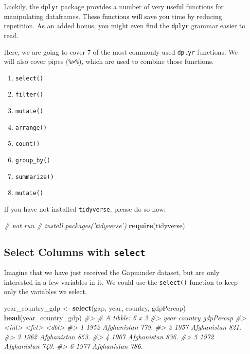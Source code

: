 \documentclass[]{book}
\newenvironment{Shaded}{\begin{snugshade}}{\end{snugshade}}
\newcommand{\KeywordTok}[1]{\textcolor[rgb]{0.13,0.29,0.53}{\textbf{#1}}}
\newcommand{\StringTok}[1]{\textcolor[rgb]{0.31,0.60,0.02}{#1}}
\newcommand{\CommentTok}[1]{\textcolor[rgb]{0.56,0.35,0.01}{\textit{#1}}}
\newcommand{\NormalTok}[1]{#1}
\providecommand{\tightlist}{%
  \setlength{\itemsep}{0pt}\setlength{\parskip}{0pt}}
\begin{document}
Luckily, the
\href{https://cran.r-project.org/web/packages/dplyr/dplyr.pdf}{\texttt{dplyr}}
package provides a number of very useful functions for manipulating
dataframes. These functions will save you time by reducing repetition.
As an added bonus, you might even find the \texttt{dplyr} grammar easier
to read.

Here, we are going to cover 7 of the most commonly used \texttt{dplyr}
functions. We will also cover pipes (\texttt{\%\textgreater{}\%}), which
are used to combine those functions.

\begin{enumerate}
\def\labelenumi{\arabic{enumi}.}
\tightlist
\item
  \texttt{select()}
\item
  \texttt{filter()}
\item
  \texttt{mutate()}
\item
  \texttt{arrange()}
\item
  \texttt{count()}
\item
  \texttt{group\_by()}
\item
  \texttt{summarize()}
\item
  \texttt{mutate()}
\end{enumerate}

If you have not installed \texttt{tidyverse}, please do so now:

\begin{Shaded}
\begin{Highlighting}[]
\CommentTok{# not run}
\CommentTok{# install.packages('tidyverse')}
\KeywordTok{require}\NormalTok{(tidyverse)}
\end{Highlighting}
\end{Shaded}

\subsection{\texorpdfstring{Select Columns with
\texttt{select}}{Select Columns with select}}\label{select-columns-with-select}

Imagine that we have just received the Gapminder dataset, but are only
interested in a few variables in it. We could use the \texttt{select()}
function to keep only the variables we select.

\begin{Shaded}
\begin{Highlighting}[]
\NormalTok{year_country_gdp <-}\StringTok{ }\KeywordTok{select}\NormalTok{(gap, year, country, gdpPercap)}
\KeywordTok{head}\NormalTok{(year_country_gdp)}
\CommentTok{#> # A tibble: 6 x 3}
\CommentTok{#>    year country     gdpPercap}
\CommentTok{#>   <int> <fct>           <dbl>}
\CommentTok{#> 1  1952 Afghanistan      779.}
\CommentTok{#> 2  1957 Afghanistan      821.}
\CommentTok{#> 3  1962 Afghanistan      853.}
\CommentTok{#> 4  1967 Afghanistan      836.}
\CommentTok{#> 5  1972 Afghanistan      740.}
\CommentTok{#> 6  1977 Afghanistan      786.}
\end{Highlighting}
\end{Shaded}
\end{document}
